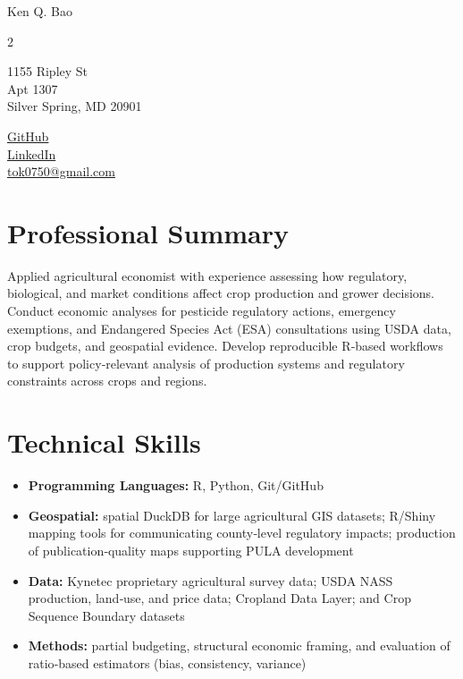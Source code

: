 \documentclass[letterpaper,11pt]{article}
\begin{document}
\begin{center}
  {\LARGE Ken Q. Bao} \\ \vspace{-3pt}
  \begin{multicols}{2}
    \begin{flushleft}
      1155 Ripley St \\ Apt 1307 \\ Silver Spring, MD 20901
    \end{flushleft}
    \begin{flushright}
      \href{https://github.com/ken-q-bao}{GitHub}\\
      \href{https://www.linkedin.com/in/ken-bao-b6089270/}{LinkedIn} \\
      \href{mailto:tok0750@gmail.com}{tok0750@gmail.com}
    \end{flushright}
  \end{multicols}
\end{center}

\section{Professional Summary}
Applied agricultural economist with experience assessing how regulatory, biological, and market conditions affect crop production and grower decisions. Conduct economic analyses for pesticide regulatory actions, emergency exemptions, and Endangered Species Act (ESA) consultations using USDA data, crop budgets, and geospatial evidence. Develop reproducible R‑based workflows to support policy‑relevant analysis of production systems and regulatory constraints across crops and regions.

\section{Technical Skills}
\begin{itemize}[leftmargin=0.15in, label={}]
\item \textbf{Programming Languages:} R, Python, Git/GitHub
\item \textbf{Geospatial:} spatial DuckDB for large agricultural GIS datasets; R/Shiny mapping tools for communicating county‑level regulatory impacts; production of publication‑quality maps supporting PULA development
\item \textbf{Data:} Kynetec proprietary agricultural survey data; USDA NASS production, land‑use, and price data; Cropland Data Layer; and Crop Sequence Boundary datasets
\item \textbf{Methods:} partial budgeting, structural economic framing, and evaluation of ratio‑based estimators (bias, consistency, variance)
\end{itemize}
\end{document}
